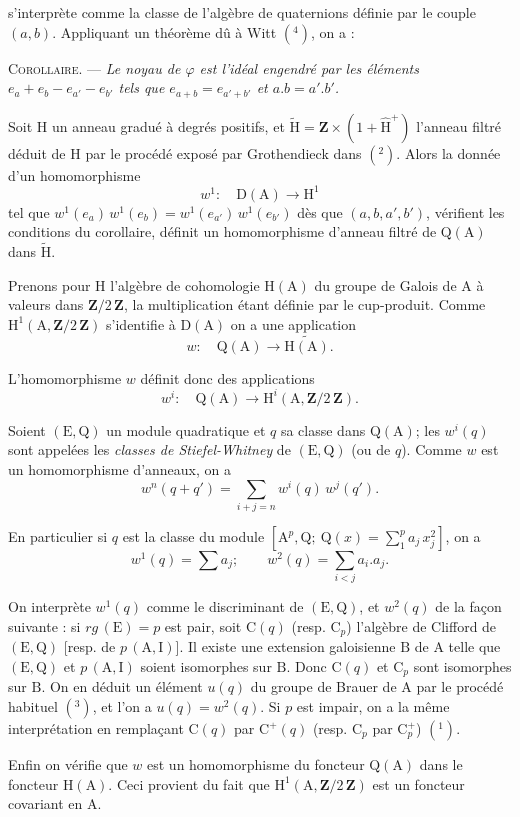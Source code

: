 s'interprète comme la classe de l'algèbre de quaternions définie par le couple $(a,b)$. Appliquant un théorème dû à Witt $(^{4})$, on a :

\textsc{Corollaire}. --- \emph{Le noyau de $\varphi$ est l'idéal engendré par les éléments $e_{a}+e_{b}-e_{a'}-e_{b'}$ tels que $e_{a+b}=e_{a'+b'}$ et $a.b=a'.b'$.}

Soit $\mathrm H$ un anneau gradué à degrés positifs, et $\widetilde{\mathrm H}=\mathbf Z\times(1+\widehat{\mathrm H}^{+})$ l'anneau filtré déduit de $\mathrm H$ par le procédé exposé par Grothendieck dans $(^{2})$. Alors la donnée d'un homomorphisme
\[
w^{1}:\quad\mathrm D(\mathrm A)\to\mathrm H^{1}
\]
tel que $w^{1}(e_{a})\,w^{1}(e_{b})=w^{1}(e_{a'})\,w^{1}(e_{b'})$ dès que $(a,b,a',b')$, vérifient les conditions du corollaire, définit un homomorphisme d'anneau filtré de $\mathrm Q(\mathrm A)$ dans $\widetilde{\mathrm H}$.

Prenons pour $\mathrm H$ l'algèbre de cohomologie $\mathrm H(\mathrm A)$ du groupe de Galois de $\mathrm A$ à valeurs dans $\mathbf Z/2\,\mathbf Z$, la multiplication étant définie par le cup-produit. Comme $\mathrm H^{1}(\mathrm A,\mathbf Z/2\,\mathbf Z)$ s'identifie à $\mathrm D(\mathrm A)$ on a une application
\[
w:\quad\mathrm Q(\mathrm A)\to\widetilde{\mathrm H(\mathrm A)}.
\]

L'homomorphisme $w$ définit donc des applications
\[
w^{i}:\quad\mathrm Q(\mathrm A)\to\mathrm H^{i}(\mathrm A,\mathbf Z/2\,\mathbf Z).
\]

Soient $(\mathrm E,\mathrm Q)$ un module quadratique et $q$ sa classe dans $\mathrm Q(\mathrm A)$; les $w^{i}(q)$ sont appelées les \emph{classes de Stiefel-Whitney} de $(\mathrm E,\mathrm Q)$ (ou de $q$). Comme $w$ est un homomorphisme d'anneaux, on a
\[
w^{n}(q+q')=\sum_{i+j=n}w^{i}(q)\,w^{j}(q').
\]

En particulier si $q$ est la classe du module $\left[\mathrm A^{p},\mathrm Q;\ \mathrm Q(x)=\displaystyle\sum_{1}^{p}a_{j}\,x_{j}^{2}\right]$, on a
\[
w^{1}(q)=\sum a_{j};\qquad w^{2}(q)=\sum_{i<j}a_{i}.a_{j}.
\]

On interprète $w^{1}(q)$ comme le discriminant de $(\mathrm E,\mathrm Q)$, et $w^{2}(q)$ de la façon suivante : si $rg\,(\mathrm E)=p$ est pair, soit $\mathrm C(q)$ (resp. $\mathrm C_{p}$) l'algèbre de Clifford de $(\mathrm E,\mathrm Q)$ [resp. de $p\,(\mathrm A,\mathrm I)$]. Il existe une extension galoisienne $\mathrm B$ de $\mathrm A$ telle que $(\mathrm E,\mathrm Q)$ et $p\,(\mathrm A,\mathrm I)$ soient isomorphes sur $\mathrm B$. Donc $\mathrm C(q)$ et $\mathrm C_{p}$ sont isomorphes sur $\mathrm B$. On en déduit un élément $u(q)$ du groupe de Brauer de $\mathrm A$ par le procédé habituel $(^{3})$, et l'on a $u(q)=w^{2}(q)$. Si $p$ est impair, on a la même interprétation en remplaçant $\mathrm C(q)$ par $\mathrm C^{+}(q)$ (resp. $\mathrm C_{p}$ par $\mathrm C_{p}^{+}$) $(^{1})$.

Enfin on vérifie que $w$ est un homomorphisme du foncteur $\mathrm Q(\mathrm A)$ dans le foncteur $\mathrm H(\mathrm A)$. Ceci provient du fait que $\mathrm H^{1}(\mathrm A,\mathbf Z/2\,\mathbf Z)$ est un foncteur covariant en $\mathrm A$.
